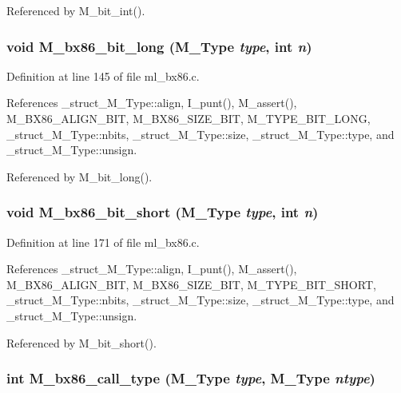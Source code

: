 Referenced by M\_\-bit\_\-int().
\subsubsection{\setlength{\rightskip}{0pt plus 5cm}void M\_\-bx86\_\-bit\_\-long (\bf{M\_\-Type} {\em type}, int {\em n})}\label{ml__bx86_8c_1a24ff2c44e9442e23c4aeb67e4d09f8}




Definition at line 145 of file ml\_\-bx86.c.

References \_\-struct\_\-M\_\-Type::align, I\_\-punt(), M\_\-assert(), M\_\-BX86\_\-ALIGN\_\-BIT, M\_\-BX86\_\-SIZE\_\-BIT, M\_\-TYPE\_\-BIT\_\-LONG, \_\-struct\_\-M\_\-Type::nbits, \_\-struct\_\-M\_\-Type::size, \_\-struct\_\-M\_\-Type::type, and \_\-struct\_\-M\_\-Type::unsign.

Referenced by M\_\-bit\_\-long().
\subsubsection{\setlength{\rightskip}{0pt plus 5cm}void M\_\-bx86\_\-bit\_\-short (\bf{M\_\-Type} {\em type}, int {\em n})}\label{ml__bx86_8c_d3907801e3d76a8c83e73fad53eca534}




Definition at line 171 of file ml\_\-bx86.c.

References \_\-struct\_\-M\_\-Type::align, I\_\-punt(), M\_\-assert(), M\_\-BX86\_\-ALIGN\_\-BIT, M\_\-BX86\_\-SIZE\_\-BIT, M\_\-TYPE\_\-BIT\_\-SHORT, \_\-struct\_\-M\_\-Type::nbits, \_\-struct\_\-M\_\-Type::size, \_\-struct\_\-M\_\-Type::type, and \_\-struct\_\-M\_\-Type::unsign.

Referenced by M\_\-bit\_\-short().
\subsubsection{\setlength{\rightskip}{0pt plus 5cm}int M\_\-bx86\_\-call\_\-type (\bf{M\_\-Type} {\em type}, \bf{M\_\-Type} {\em ntype})}\label{ml__bx86_8c_1a8ac9ccaa749230a50771322bfb0f2f}




